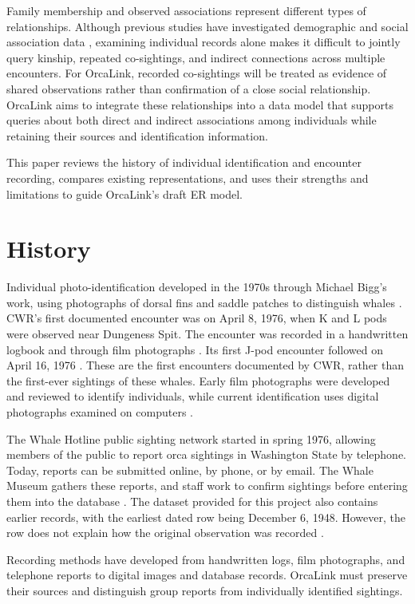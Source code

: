 \documentclass[sigconf]{acmart}
\begin{document}
Family membership and observed associations represent different types of relationships. Although previous studies have investigated demographic and social association data \cite{ellis2017}, examining individual records alone makes it difficult to jointly query kinship, repeated co-sightings, and indirect connections across multiple encounters. For OrcaLink, recorded co-sightings will be treated as evidence of shared observations rather than confirmation of a close social relationship. OrcaLink aims to integrate these relationships into a data model that supports queries about both direct and indirect associations among individuals while retaining their sources and identification information.

This paper reviews the history of individual identification and encounter recording, compares existing representations, and uses their strengths and limitations to guide OrcaLink's draft ER model.

\section{History}

Individual photo-identification developed in the 1970s through Michael Bigg's work, using photographs of dorsal fins and saddle patches to distinguish whales \cite{cwrOrcaID}. CWR's first documented encounter was on April 8, 1976, when K and L pods were observed near Dungeness Spit. The encounter was recorded in a handwritten logbook and through film photographs \cite{cwrFirstEncounter}. Its first J-pod encounter followed on April 16, 1976 \cite{cwrhistory}. These are the first encounters documented by CWR, rather than the first-ever sightings of these whales. Early film photographs were developed and reviewed to identify individuals, while current identification uses digital photographs examined on computers \cite{cwrOrcaID}.

The Whale Hotline public sighting network started in spring 1976, allowing members of the public to report orca sightings in Washington State by telephone. Today, reports can be submitted online, by phone, or by email. The Whale Museum gathers these reports, and staff work to confirm sightings before entering them into the database \cite{whaleHotline}. The dataset provided for this project also contains earlier records, with the earliest dated row being December 6, 1948. However, the row does not explain how the original observation was recorded \cite{whalemuseum_dataset}.

Recording methods have developed from handwritten logs, film photographs, and telephone reports to digital images and database records. OrcaLink must preserve their sources and distinguish group reports from individually identified sightings.
\end{document}
